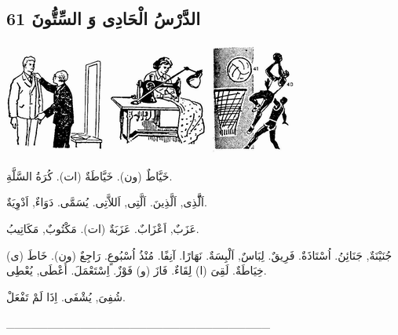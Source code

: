 \documentclass[a5paper]{article}
\begin{document}
\subsection{الدَّرْسُ الْحَادِى وَ السِّتُّونَ 61}
 \includegraphics[width=1.3126in,height=1.3335in]{images/MuhammadBagauddinprettified-img196.png}   \includegraphics[width=1.3126in,height=1.3335in]{images/MuhammadBagauddinprettified-img197.png}   \includegraphics[width=1.1354in,height=1.4583in]{images/MuhammadBagauddinprettified-img198.png} 

خَيَّاطٌ (ون). خَيَّاطَةٌ (ات). كُرَةُ السَّلَّةِ. 

اَلَّّذِى, اَلَّذِينَ. اَلَّتِى, اَللاَّتِى. يُسَمَّى. دَوَاءٌ, اَدْوِيَةٌ. 

عَزَبٌ, اَعْزَابٌ. عَزَبَةٌ (ات). مَكْتُوبٌ, مَكَاتِيبُ. 

جُنَيْنَةٌ, جَنَائِنُ. اُسْتَاذَةٌ. فَرِيقٌ. لِبَاسٌ, اَلْبِسَةٌ. نَهَارًا. آنِفًا. مُنْذُ اُسْبُوعٍ. رَاجِعٌ (ون). خَاطَ (ى) خِيَاطَةٌ. لَقِىَ (ا) لِقَاءٌ. فَازَ (و) فَوْزٌ. اِسْتَعْمَلَ. أَعْطَى, يُعْطِى. 

شُفِىَ, يُشْفَى. اِذَا لَمْ تَفْعَلْ. 

\_\_\_\_\_\_\_\_\_\_\_\_\_\_\_\_\_\_\_\_\_\_\_\_\_\_\_\_\_\_\_\_
\end{document}
